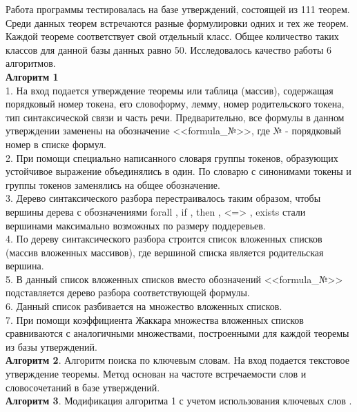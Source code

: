 \documentclass[12pt]{article}
\begin{document}
Работа программы тестировалась на базе утверждений, состоящей из 111 теорем. Среди данных теорем встречаются разные формулировки одних и тех же теорем. Каждой теореме соответствует свой отдельный класс. Общее количество таких классов для данной базы данных равно 50. Исследовалось качество работы 6 алгоритмов.\\

\textbf{Алгоритм 1} \\

1. На вход подается утверждение теоремы или таблица (массив), содержащая порядковый номер токена, его словоформу, лемму, номер родительского токена, тип синтаксической связи и часть речи. Предварительно, все формулы в данном утверждении заменены на обозначение <<formula\_№>>, где $№$ - порядковый номер в списке формул.\\

2. При помощи специально написанного словаря группы токенов, образующих устойчивое выражение объединялись в один. По словарю с синонимами токены и группы токенов заменялись на общее обозначение. \\

3. Дерево синтаксического разбора перестраивалось таким образом, чтобы вершины дерева с обозначениями forall , if , then , <=> , exists стали вершинами максимально возможных по размеру поддеревьев. \\

4. По дереву синтаксического разбора строится список вложенных списков (массив вложенных массивов), где вершиной списка является родительская вершина. \\

5. В данный список вложенных списков  вместо  обозначений <<formula\_№>> подставляется дерево разбора соответствующей формулы. \\

6. Данный список разбивается на множество вложенных списков. \\

7. При помощи коэффициента Жаккара множества вложенных списков сравниваются с аналогичными множествами, построенными для каждой теоремы из базы утверждений. \\

\textbf{Алгоритм 2}. Алгоритм поиска по ключевым словам. На вход подается текстовое утверждение теоремы. Метод основан на частоте встречаемости слов и словосочетаний в базе утверждений.\\

\newpage
\textbf{Алгоритм 3}. Модификация алгоритма 1 с учетом использования ключевых слов . \\
\end{document}
